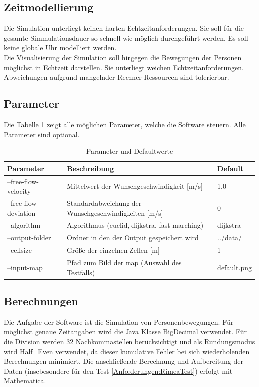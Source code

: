 \subsection{Zeitmodellierung}
Die Simulation unterliegt keinen harten Echtzeitanforderungen. Sie soll für die gesamte Simmulationsdauer so schnell wie möglich durchgeführt werden. Es soll keine globale Uhr modelliert werden. \\
Die Visualisierung der Simulation soll hingegen die Bewegungen der Personen möglichst in Echtzeit darstellen. Sie unterliegt weichen Echtzeitanforderungen. Abweichungen aufgrund mangelnder Rechner-Ressourcen sind tolerierbar. 

\subsection{Parameter}
Die Tabelle \ref{tab:parameter} zeigt alle möglichen Parameter, welche die Software steuern. Alle Parameter sind optional.
\begin{table}[htpb]
	\centering
	\begin{tabular}{lll}
		Parameter & Beschreibung  &  Default\\ \hline
		--free-flow-velocity & Mittelwert der Wunschgeschwindigkeit [m/s] & 1,0 \\
		--free-flow-deviation & Standardabweichung der Wunschgeschwindigkeiten [m/s] & 0 \\
		--algorithm & Algorithmus (euclid, dijkstra, fast-marching) & dijkstra \\
		--output-folder & Ordner in den der Output gespeichert wird & ../data/ \\
		--cellsize & Größe der einzelnen Zellen [m] & 1 \\
		--input-map & Pfad zum Bild der map (Auswahl des Testfalls) & default.png \\
		
	\end{tabular}
	\caption{Parameter und Defaultwerte}
	\label{tab:parameter}
\end{table}
	
\subsection{Berechnungen}
Die Aufgabe der Software ist die Simulation von Personenbewegungen. Für möglichst genaue Zeitangaben wird die Java Klasse BigDecimal verwendet. Für die Division werden 32 Nachkommastellen berücksichtigt und als Rundungsmodus wird Half\_Even verwendet, da dieser kumulative Fehler bei sich wiederholenden Berechnungen minimiert. Die anschließende Berechnung und Aufbereitung der Daten (insebesondere für den Test \ref{Anforderungen:RimeaTest}) erfolgt mit Mathematica.

